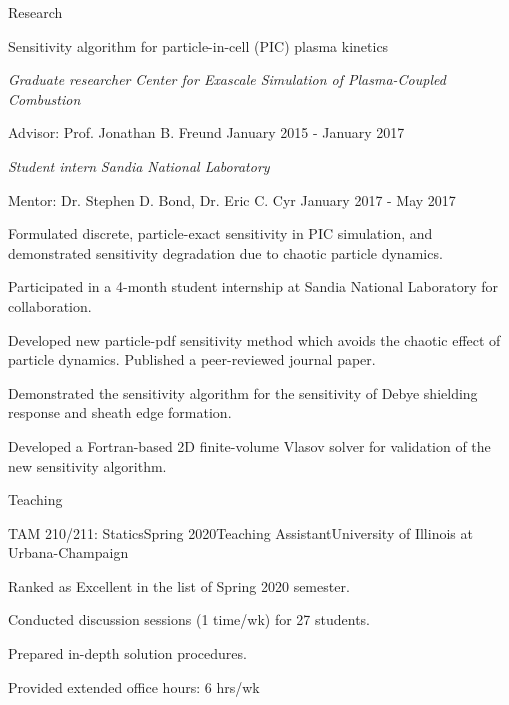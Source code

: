 \documentclass{resume} %
\begin{document}
\begin{rSection}{Research}
\begin{rSubsection}{Sensitivity algorithm for particle-in-cell (PIC) plasma kinetics}{}{}{}
\item[] \textit{Graduate researcher} \hfill \textit{Center for Exascale Simulation of Plasma-Coupled Combustion}
\item[] Advisor: Prof. Jonathan B. Freund \hfill January 2015 - January 2017
\item[] \textit{Student intern} \hfill \textit{Sandia National Laboratory}
\item[] Mentor: Dr. Stephen D. Bond, Dr. Eric C. Cyr \hfill January 2017 - May 2017
\smallskip
\item Formulated discrete, particle-exact sensitivity in PIC simulation,
and demonstrated sensitivity degradation due to chaotic particle dynamics.
\item Participated in a 4-month student internship at Sandia National Laboratory for collaboration.
\item Developed new particle-pdf sensitivity method
which avoids the chaotic effect of particle dynamics.
Published a peer-reviewed journal paper.
\item Demonstrated the sensitivity algorithm
for the sensitivity of Debye shielding response and sheath edge formation.
\item Developed a Fortran-based 2D finite-volume Vlasov solver for validation of the new sensitivity algorithm.
\end{rSubsection}

\end{rSection}

\begin{rSection}{Teaching}


\begin{rSubsection}{TAM 210/211: Statics}{Spring 2020}{Teaching Assistant}{University of Illinois at Urbana-Champaign}
\item Ranked as Excellent in the list of Spring 2020 semester.
\item Conducted discussion sessions (1 time/wk) for 27 students.
\item Prepared in-depth solution procedures.
\item Provided extended office hours: 6 hrs/wk
\end{rSubsection}


\end{rSection}
\end{document}

